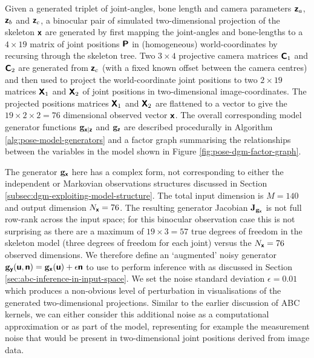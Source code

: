Given a generated triplet of joint-angles, bone length and camera parameters $\boldsymbol{\mathsf{z}}_a$, $\boldsymbol{\mathsf{z}}_b$ and $\boldsymbol{\mathsf{z}}_c$, a binocular pair of simulated two-dimensional projection of the skeleton $\boldsymbol{\mathsf{x}}$ are generated by first mapping the joint-angles and bone-lengths to a $4 \times 19$ matrix of joint positions $\boldsymbol{\mathsf{P}}$ in (homogeneous) world-coordinates by recursing through the skeleton tree. Two $3 \times 4$ projective camera matrices $\boldsymbol{\mathsf{C}}_1$ and $\boldsymbol{\mathsf{C}}_2$ are generated from $\boldsymbol{\mathsf{z}}_c$ (with a fixed known offset between the camera centres) and then used to project the world-coordinate joint positions to two $2 \times 19$ matrices $\boldsymbol{\mathsf{X}}_1$ and $\boldsymbol{\mathsf{X}}_2$ of joint positions in two-dimensional image-coordinates. The projected positions matrices $\boldsymbol{\mathsf{X}}_1$ and $\boldsymbol{\mathsf{X}}_2$ are flattened to a vector to give the $19 \times 2 \times 2= 76$ dimensional observed vector $\boldsymbol{\mathsf{x}}$. The overall corresponding model generator functions ${\mathbf{g}}_{\boldsymbol{\mathsf{x}}|\boldsymbol{\mathsf{z}}}$ and ${\mathbf{g}}_{\boldsymbol{\mathsf{z}}}$ are described procedurally in Algorithm \ref{alg:pose-model-generators} and a factor graph summarising the relationships between the variables in the model shown in Figure \ref{fig:pose-dgm-factor-graph}.

The generator ${\mathbf{g}}_{\boldsymbol{\mathsf{x}}}$ here has a complex form, not corresponding to either the independent or Markovian observations structures discussed in Section \ref{subsec:dgm-exploiting-model-structure}. The total input dimension is $M=140$ and output dimension $N_{\boldsymbol{\mathsf{x}}} = 76$. The resulting generator Jacobian $\mathbf{J}_{{\mathbf{g}}_{\boldsymbol{\mathsf{x}}}}$ is not full row-rank across the input space; for this binocular observation case this is not surprising as there are a maximum of $19 \times 3 = 57$ true degrees of freedom in the skeleton model (three degrees of freedom for each joint) versus the $N_{\boldsymbol{\mathsf{x}}} = 76$ observed dimensions. We therefore define an `augmented' noisy generator ${\mathbf{g}}_{\boldsymbol{\mathsf{y}}}(\boldsymbol{\mathsf{u}},\boldsymbol{\mathsf{n}}) = {\mathbf{g}}_{\boldsymbol{\mathsf{x}}}(\boldsymbol{\mathsf{u}}) + \epsilon\boldsymbol{\mathsf{n}}$ to use to perform inference with as discussed in Section \ref{sec:abc-inference-in-input-space}. We set the noise standard deviation $\epsilon = 0.01$ which produces a non-obvious level of perturbation in visualisations of the generated two-dimensional projections. Similar to the earlier discussion of \ac{ABC} kernels, we can either consider this additional noise as a computational approximation or as part of the model, representing for example the measurement noise that would be present in two-dimensional joint positions derived from image data.

